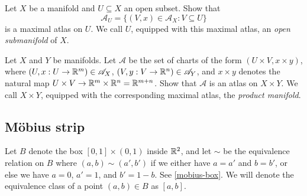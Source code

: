 \begin{exercise} \label{open-submanifold}
	Let $X$ be a manifold and $U \subseteq X$ an open subset. Show that \[ \mathscr{A}_U = \{ (V,x) \in \mathscr{A}_X : V \subseteq U \} \]
	is a maximal atlas on $U$. We call $U$, equipped with this maximal atlas, an \emph{open submanifold} of $X$. 
\end{exercise}

\begin{exercise}
	Let $X$ and $Y$ be manifolds. Let $\mathscr{A}$ be the set of charts of the form $(U \times V, x \times y)$, where $(U,x : U \to \mathbb{R}^m) \in \mathscr{A}_X$, $(V, y : V \to \mathbb{R}^n) \in \mathscr{A}_Y$, and $x \times y$ denotes the natural map $U \times V \to \mathbb{R}^m \times \mathbb{R}^n = \mathbb{R}^{m+n}$. Show that $\mathscr{A}$ is an atlas on $X \times Y$. We call $X \times Y$, equipped with the corresponding maximal atlas, the \emph{product manifold}. 
\end{exercise}

\subsection{M\"obius strip}

Let $B$ denote the box $[0,1] \times (0,1)$ inside $\mathbb{R}^2$, and let $\sim$ be the equivalence relation on $B$ where $(a,b) \sim (a',b')$ if we either have $a = a'$ and $b = b'$, or else we have $a = 0$, $a' = 1$, and $b' = 1-b$. See \cref{mobius-box}. We will denote the equivalence class of a point $(a, b) \in B$ as $[a, b]$. 


